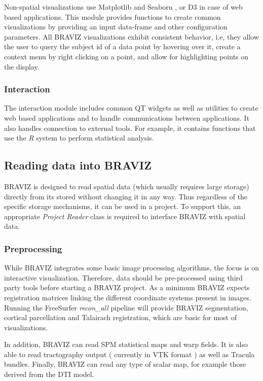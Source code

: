 \documentclass{frontiersHLTH}
\begin{document}
Non-spatial visualizations use Matplotlib \cite{hunter_matplotlib:_2007} and Seaborn \cite{michael_waskom_seaborn:_2015}, or D3  \cite{bostock_d3_2011} in case of web based applications. This module provides functions to create common visualizations by providing an input data-frame and other configuration parameters. All BRAVIZ visualizations exhibit consistent behavior, i.e, they  allow the user to query the subject id of a data point by hovering over it, create a context menu by right clicking on a point, and allow for highlighting points on the display. 

\subsubsection{Interaction}

The interaction module includes common QT widgets as well as utilities to create web based applications and to handle communications between applications. It also handles connection to external tools. For example, it contains functions that use the \emph{R} system to perform statistical analysis. 

\subsection{Reading data into BRAVIZ}

BRAVIZ is designed to read spatial data (which usually requires large storage) directly from its stored without changing it in any way. Thus regardless of the specific storage mechanisms, it can be used in a project. To support this, an appropriate \emph{Project Reader} class is required to interface BRAVIZ with spatial data.

\subsubsection{Preprocessing}

While BRAVIZ integrates some basic image processing algorithms, the focus is on interactive visualization. Therefore,  data should be pre-processed using third party tools before starting a BRAVIZ project. As a minimum BRAVIZ expects registration matrices linking the different coordinate systems present in images. Running the FreeSurfer \emph{recon\_all} pipeline will provide BRAVIZ segmentation, cortical parcellation and Talairach registration, which are basic for most of visualizations. 

In addition, BRAVIZ can read SPM statistical maps and warp fields. It is also able to read tractography output ( currently in VTK format ) as well as Tracula bundles. Finally, BRAVIZ can read any type of scalar map, for example those derived from the DTI model.
\end{document}
